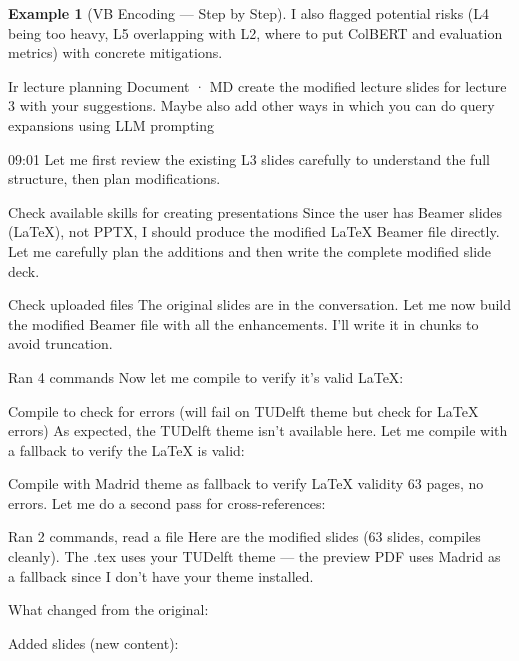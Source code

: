 \documentclass[aspectratio=169]{beamer} \usetheme{TUDelft} %
\theoremstyle{definition}
\newtheorem{example}{Example}[section]
\theoremstyle{plain}
\begin{document}
\begin{example}[VB Encoding --- Step by Step]
I also flagged potential risks (L4 being too heavy, L5 overlapping with L2, where to put ColBERT and evaluation metrics) with concrete mitigations.

Ir lecture planning
Document · MD 
create the modified lecture slides for lecture 3 with your suggestions. Maybe also add other ways in which you can do query expansions using LLM prompting

09:01
Let me first review the existing L3 slides carefully to understand the full structure, then plan modifications.


Check available skills for creating presentations
Since the user has Beamer slides (LaTeX), not PPTX, I should produce the modified LaTeX Beamer file directly. Let me carefully plan the additions and then write the complete modified slide deck.


Check uploaded files
The original slides are in the conversation. Let me now build the modified Beamer file with all the enhancements. I'll write it in chunks to avoid truncation.


Ran 4 commands
Now let me compile to verify it's valid LaTeX:


Compile to check for errors (will fail on TUDelft theme but check for LaTeX errors)
As expected, the TUDelft theme isn't available here. Let me compile with a fallback to verify the LaTeX is valid:


Compile with Madrid theme as fallback to verify LaTeX validity
63 pages, no errors. Let me do a second pass for cross-references:


Ran 2 commands, read a file
Here are the modified slides (63 slides, compiles cleanly). The .tex uses your TUDelft theme — the preview PDF uses Madrid as a fallback since I don't have your theme installed.

What changed from the original:

Added slides (new content):


\end{example}
\end{document}
